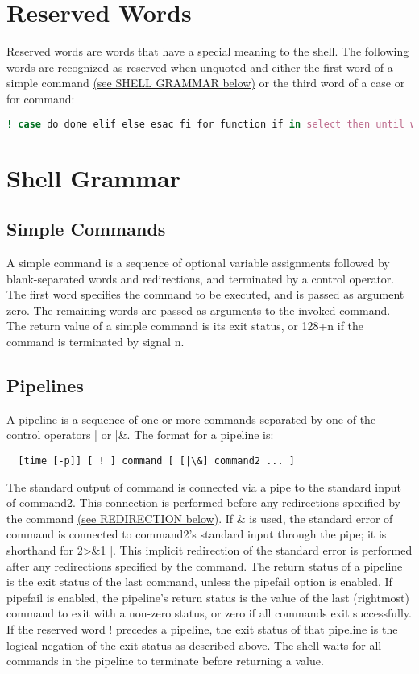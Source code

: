 \documentclass[11pt]{article}
\begin{document}
\section{Reserved Words}
\label{sec:reservedwords}
Reserved words are words that have a special meaning to the shell. The following words are recognized as reserved when unquoted and either the first word of a simple command \hyperref[sec:shellgrammar]{(see SHELL GRAMMAR below)} or the third word of a case or for command:

\begin{lstlisting}[language=bash,breaklines=true]
  ! case do done elif else esac fi for function if in select then until while { } time [[ ]]
\end{lstlisting}

\section{Shell Grammar}
\label{sec:shellgrammar}
\subsection{Simple Commands}

A simple command is a sequence of optional variable assignments followed by blank-separated words and redirections, and terminated by a control operator. The first word specifies the command to be executed, and is passed as argument zero. The remaining words are passed as arguments to the invoked command.
The return value of a simple command is its exit status, or 128+n if the command is terminated by signal n.

\subsection{Pipelines}

A pipeline is a sequence of one or more commands separated by one of the control operators | or |\&. The format for a pipeline is:
\begin{lstlisting}
  [time [-p]] [ ! ] command [ [|\&] command2 ... ]
\end{lstlisting}
The standard output of command is connected via a pipe to the standard input of command2. This connection is performed before any redirections specified by the command \hyperref[sec:redirection]{(see REDIRECTION below)}. If \& is used, the standard error of command is connected to command2's standard input through the pipe; it is shorthand for 2>\&1 |. This implicit redirection of the standard error is performed after any redirections specified by the command.
The return status of a pipeline is the exit status of the last command, unless the pipefail option is enabled. If pipefail is enabled, the pipeline's return status is the value of the last (rightmost) command to exit with a non-zero status, or zero if all commands exit successfully. If the reserved word ! precedes a pipeline, the exit status of that pipeline is the logical negation of the exit status as described above. The shell waits for all commands in the pipeline to terminate before returning a value.
\end{document}
